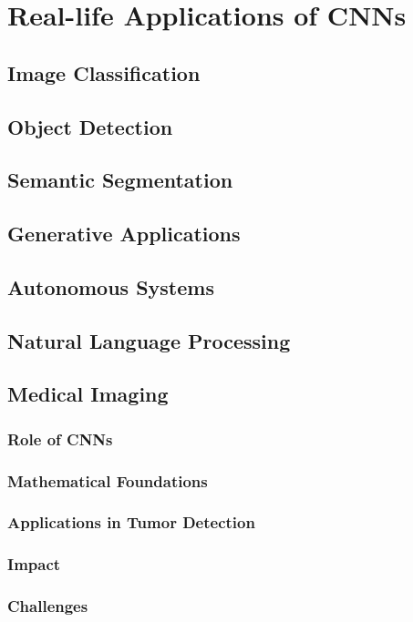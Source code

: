 \chapter{Real-life Applications of CNNs}\label{chp:6}
\section{Image Classification}
\section{Object Detection}
\section{Semantic Segmentation}
\section{Generative Applications}
\section{Autonomous Systems}
\section{Natural Language Processing}
\section{Medical Imaging}
\subsection{Role of CNNs}
\subsection{Mathematical Foundations}
\subsection{Applications in Tumor Detection}
\subsection{Impact}
\subsection{Challenges}